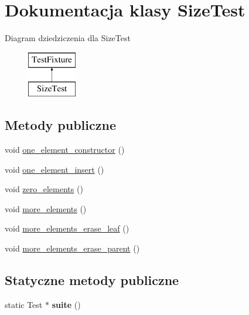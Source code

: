 \hypertarget{class_size_test}{}\section{Dokumentacja klasy Size\+Test}
\label{class_size_test}
Diagram dziedziczenia dla Size\+Test\begin{figure}[H]
\begin{center}
\leavevmode
\includegraphics[height=2.000000cm]{class_size_test}
\end{center}
\end{figure}
\subsection*{Metody publiczne}
\begin{DoxyCompactItemize}
\item 
void \hyperlink{class_size_test_a85261b7c20794c5d64335ca31cdf37cf}{one\+\_\+element\+\_\+constructor} ()
\item 
void \hyperlink{class_size_test_a0aca43b07dd7f2dc7abb018193c7957a}{one\+\_\+element\+\_\+insert} ()
\item 
void \hyperlink{class_size_test_aaed7bed9e378c1d8f57b841b20f25caa}{zero\+\_\+elements} ()
\item 
void \hyperlink{class_size_test_a8746c855c3846914d88c34c061197682}{more\+\_\+elements} ()
\item 
void \hyperlink{class_size_test_a02868a105b57f585aaa7d435c3208d61}{more\+\_\+elements\+\_\+erase\+\_\+leaf} ()
\item 
void \hyperlink{class_size_test_addf81e5e704a50add6060c1810eabba9}{more\+\_\+elements\+\_\+erase\+\_\+parent} ()
\end{DoxyCompactItemize}
\subsection*{Statyczne metody publiczne}
\begin{DoxyCompactItemize}
\item 
\mbox{\label{class_size_test_ad83c4e302657fd74119fbcc78f31e47f}} 
static Test $\ast$ {\bfseries suite} ()
\end{DoxyCompactItemize}


